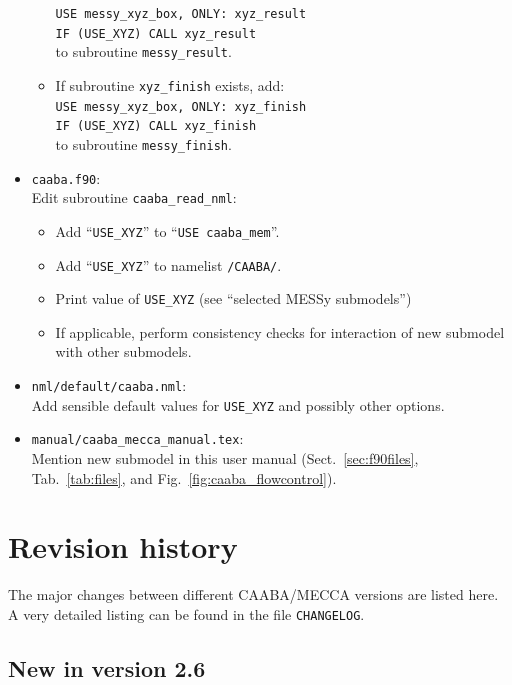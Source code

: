 \documentclass[twoside]{article}
\begin{document}
\begin{itemize}
\begin{itemize}
    \verb|USE messy_xyz_box, ONLY: xyz_result|\\
    \verb|IF (USE_XYZ) CALL xyz_result|\\
    to subroutine \verb|messy_result|.
  \item If subroutine \verb|xyz_finish| exists, add:\\
    \verb|USE messy_xyz_box, ONLY: xyz_finish|\\
    \verb|IF (USE_XYZ) CALL xyz_finish|\\
    to subroutine \verb|messy_finish|.
  \end{itemize}
\item \verb|caaba.f90|:\\
  Edit subroutine \verb|caaba_read_nml|:
  \begin{itemize}
  \item Add ``\verb|USE_XYZ|'' to ``\verb|USE caaba_mem|''.
  \item Add ``\verb|USE_XYZ|'' to namelist \verb|/CAABA/|.
  \item Print value of \verb|USE_XYZ| (see ``selected MESSy submodels'')
  \item If applicable, perform consistency checks for interaction of new
    submodel with other submodels.
  \end{itemize}
\item \verb|nml/default/caaba.nml|:\\
  Add sensible default values for \verb|USE_XYZ| and possibly other
  options.
\item \verb|manual/caaba_mecca_manual.tex|:\\
  Mention new submodel in this user manual (Sect.~\ref{sec:f90files},
  Tab.~\ref{tab:files}, and Fig.~\ref{fig:caaba_flowcontrol}).
\end{itemize}

\section{Revision history}

The major changes between different CAABA/MECCA versions are listed
here. A very detailed listing can be found in the file \verb|CHANGELOG|.

\subsection*{New in version 2.6}
\end{document}
